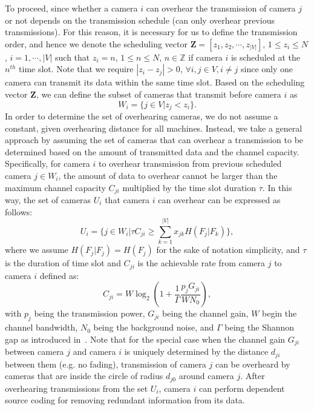To proceed, since whether a camera $i$ can overhear the transmission of camera $j$ or not depends on the transmission schedule (can only overhear previous transmissions).
For this reason, it is necessary for us to define the transmission order, and hence we denote the scheduling vector ${\mathbf{Z} = [z_1, z_2, \cdots, z_{|V|}]}$, ${1 \leq z_i \leq N}$, ${i=1,\cdots,|V|}$ such that ${z_i = n}$, ${1 \leq n \leq N}$, ${n \in \mathbb{Z}}$ if camera $i$ is scheduled at the $n^{th}$ time slot.
Note that we require ${|z_i - z_j| > 0}$, ${\forall i,j \in V, i \neq j }$ since only one camera can transmit its data within the same time slot.
Based on the scheduling vector $\mathbf{Z}$, we can define the subset of cameras that transmit before camera $i$ as
\begin{equation}
W_i = \{ j \in V | z_j < z_i \}.
\label{eq::prevSet}
\end{equation}
In order to determine the set of overhearing cameras, we do not assume a constant, given overhearing distance for all machines.
Instead, we take a general approach by assuming the set of cameras that can overhear a transmission to be determined based on the amount of transmitted data and the channel capacity.
Specifically, for camera $i$ to overhear transmission from previous scheduled camera $j \in W_i$, the amount of data to overhear cannot be larger than the maximum channel capacity $C_{ji}$ multiplied by the time slot duration $\tau$.
In this way, the set of cameras $U_i$ that camera $i$ can overhear can be expressed as follows:
\begin{equation}
U_i = \{ j \in W_i | \tau C_{ji} \geq \sum_{k=1}^{|V|}x_{jk}H(F_j|F_k) \},
\label{eq::overSet}
\end{equation}
where we assume $H(F_j|F_j) = H(F_j)$ for the sake of notation simplicity, and $\tau$ is the duration of time slot and $C_{ji}$ is the achievable rate from camera $j$ to camera $i$ defined as:
\begin{equation}
C_{ji} = W \log_2 \left( 1+\frac{1}{\Gamma} \frac{p_j G_{ji}}{WN_0} \right),
\label{eq::capacity}
\end{equation}
with $p_j$ being the transmission power, $G_{ji}$ being the channel gain, $W$ begin the channel bandwidth, $N_0$ being the background noise, and $\Gamma$ being the Shannon gap as introduced in~\cite{MQAM}.
Note that for the special case when the channel gain $G_{ji}$ between camera $j$ and camera $i$ is uniquely determined by the distance $d_{ji}$ between them (e.g. no fading), transmission of camera $j$ can be overheard by cameras that are inside the circle of radius $d_{j0}$ around camera $j$.
After overhearing transmissions from the set $U_i$, camera $i$ can perform dependent source coding for removing redundant information from its data.

